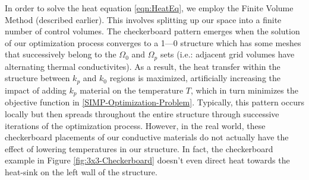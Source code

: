 In order to solve the heat equation \eqref{eqn:HeatEq}, we employ the Finite Volume Method (described earlier). This involves splitting up our space into a finite number of control volumes. The checkerboard pattern emerges when the solution of our optimization process converges to a 1---0 structure which has some meshes that successively belong to the $\Omega_0$ and $\Omega_p$ sets (i.e.: adjacent grid volumes have alternating thermal conductivites). As a result, the heat transfer within the structure between $k_p$ and $k_0$ regions is maximized, artificially increasing the impact of adding $k_p$ material on the temperature $T$, which in turn minimizes the objective function in \eqref{SIMP-Optimization-Problem}. Typically, this pattern occurs locally but then spreads throughout the entire structure through successive iterations of the optimization process. However, in the real world, these checkerboard placements of our conductive materials do not actually have the effect of lowering temperatures in our structure. In fact, the checkerboard example in Figure \ref{fig:3x3-Checkerboard} doesn't even direct heat towards the heat-sink on the left wall of the structure.

